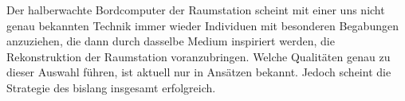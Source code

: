 \begin{newstuff}

    Der halberwachte Bordcomputer der Raumstation  scheint mit einer uns nicht genau bekannten Technik immer wieder Individuen mit besonderen Begabungen anzuziehen, die dann durch dasselbe Medium inspiriert werden, die Rekonstruktion der Raumstation voranzubringen. Welche Qualitäten genau zu dieser Auswahl führen, ist aktuell nur in Ansätzen bekannt. Jedoch scheint die Strategie des  bislang insgesamt erfolgreich.
\end{newstuff}


    

